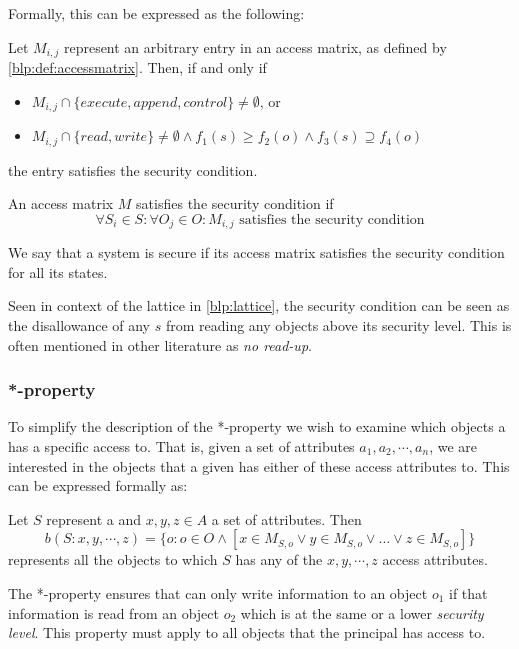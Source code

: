 Formally, this can be expressed as the following:
\begin{definition}
Let $M_{i,j}$ represent an arbitrary entry in an access matrix, as defined by \cref{blp:def:accessmatrix}.
Then, if and only if
\begin{itemize}
  \item $M_{i,j} \cap \{execute, append, control\} \neq \emptyset$, or
  \item $M_{i,j} \cap \{read, write\} \neq \emptyset \wedge f_1(s) \ge f_2(o) \wedge f_3(s) \supseteq f_4(o)$
\end{itemize}
the entry satisfies the security condition.

\end{definition}
\begin{definition}
An access matrix $M$ satisfies the security condition if
$$\forall S_i \in S: \forall O_j \in O: M_{i,j} \text{ satisfies the security condition}$$

We say that a system is secure if its access matrix satisfies the security condition for all its states.
\end{definition}

Seen in context of the lattice in \cref{blp:lattice}, the security condition can be seen as the disallowance of any \ssubject{} $s$ from reading any objects above its security level.
This is often mentioned in other literature as \emph{no read-up}.

\subsubsection{*-property}
To simplify the description of the *-property we wish to examine which objects a \principal{} has a specific access to.
That is, given a set of attributes $a_1, a_2, \cdots, a_n$, we are interested in the objects that a given \principal{} has either of these access attributes to.
This can be expressed formally as:

\begin{definition}
  Let $S$ represent a \principal{} and $x,y,z \in A$ a set of attributes.
  Then $$b(S:x, y, \cdots, z) = \{o:o\in O \wedge [x \in M_{S,o} \vee y \in M_{S,o} \vee \dots \vee z \in M_{S,o}]\}$$
  represents all the objects to which $S$ has any of the $x, y, \cdots, z$ access attributes.
\end{definition}

The *-property ensures that \principals{} can only write information to an object $o_1$ if that information is read from an object $o_2$ which is at the same or a lower \emph{security level}.
This property must apply to all objects that the principal has access to.

